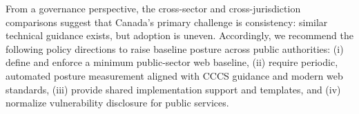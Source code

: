 \documentclass[a4paper,fleqn]{cas-sc}
\begin{document}

From a governance perspective, the cross-sector and cross-jurisdiction comparisons suggest that Canada's primary challenge is consistency: similar technical guidance exists, but adoption is uneven.
Accordingly, we recommend the following policy directions to raise baseline posture across public authorities: 
(i) define and enforce a minimum public-sector web baseline, 
(ii) require periodic, automated posture measurement aligned with CCCS guidance and modern web standards,
(iii) provide shared implementation support and templates, and
(iv) normalize vulnerability disclosure for public services.


\end{document}
